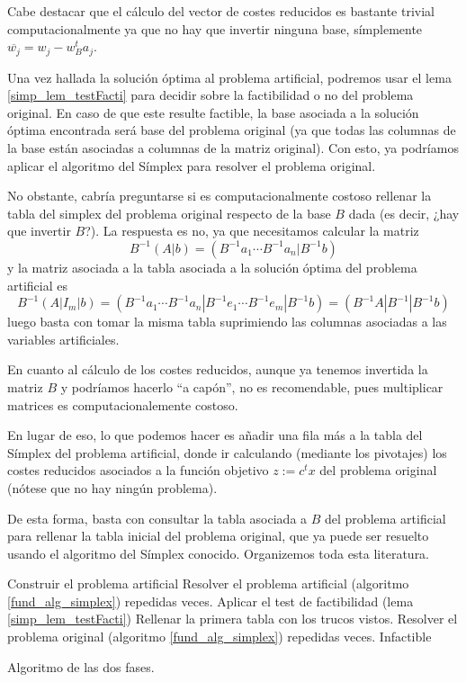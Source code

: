 Cabe destacar que el cálculo del vector de costes reducidos es bastante trivial computacionalmente ya que no hay que invertir ninguna base, símplemente $\overline{w_j}=w_j-w_B^ta_j$.

Una vez hallada la solución óptima al problema artificial, podremos usar el lema \ref{simp_lem_testFacti} para decidir sobre la factibilidad o no del problema original. En caso de que este resulte factible, la base asociada a la solución óptima encontrada será base del problema original (ya que todas las columnas de la base están asociadas a columnas de la matriz original). Con esto, ya podríamos aplicar el algoritmo del Símplex para resolver el problema original.

No obstante, cabría preguntarse si es computacionalmente costoso rellenar la tabla del simplex del problema original respecto de la base $B$ dada (es decir, ¿hay que invertir $B$?). La respuesta es no, ya que necesitamos calcular la matriz
\begin{equation*}
	B^{-1}(A|b)=(B^{-1}a_1\cdots B^{-1}a_n|B^{-1}b)
\end{equation*}
y la matriz asociada a la tabla asociada a la solución óptima del problema artificial es
\begin{equation*}
	B^{-1}(A|I_m|b)=(B^{-1}a_1\cdots B^{-1}a_n|B^{-1}e_1\cdots B^{-1}e_m|B^{-1}b)=(B^{-1}A|B^{-1}|B^{-1}b)
\end{equation*}
luego basta con tomar la misma tabla suprimiendo las columnas asociadas a las variables artificiales.

En cuanto al cálculo de los costes reducidos, aunque ya tenemos invertida la matriz $B$ y podríamos hacerlo ``a capón'', no es recomendable, pues multiplicar matrices es computacionalemente costoso.

En lugar de eso, lo que podemos hacer es añadir una fila más a la tabla del Símplex del problema artificial, donde ir calculando (mediante los pivotajes) los costes reducidos asociados a la función objetivo $z:=c^tx$ del problema original (nótese que no hay ningún problema).

De esta forma, basta con consultar la tabla asociada a $B$ del problema artificial para rellenar la tabla inicial del problema original, que ya puede ser resuelto usando el algoritmo del Símplex conocido. Organizemos toda esta literatura.
\begin{algorithm}[H]
	\begin{algorithmic}[1]
		\STATE{}
			\STATE Construir el problema artificial
			\STATE Resolver el problema artificial (algoritmo \ref{fund_alg_simplex}) repedidas veces.
			\STATE Aplicar el test de factibilidad (lema \ref{simp_lem_testFacti})
				\STATE{}
				\STATE Rellenar la primera tabla con los trucos vistos.
				\STATE Resolver el problema original (algoritmo \ref{fund_alg_simplex}) repedidas veces.
			\ELSE
				\RETURN Infactible
			\ENDIF
	\end{algorithmic}
	\caption{Algoritmo de las dos fases.}\label{simp_alg_dosFases}
\end{algorithm}

